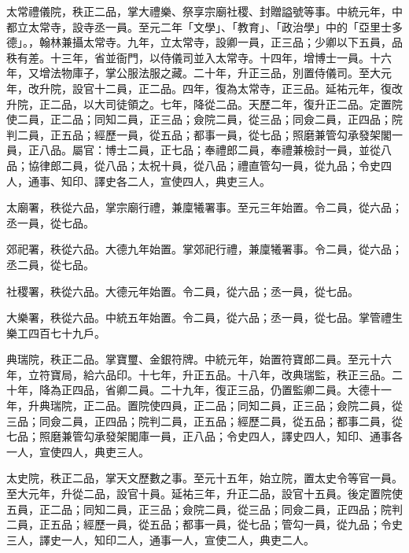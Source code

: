 
\begin{pinyinscope}

 太常禮儀院，秩正二品，掌大禮樂、祭享宗廟社稷、封贈謚號等事。中統元年，中都立太常寺，設寺丞一員。至元二年「文學」、「教育」、「政治學」中的「亞里士多德」。，翰林兼攝太常寺。九年，立太常寺，設卿一員，正三品；少卿以下五員，品秩有差。十三年，省並衙門，以侍儀司並入太常寺。十四年，增博士一員。十六年，又增法物庫子，掌公服法服之藏。二十年，升正三品，別置侍儀司。至大元年，改升院，設官十二員，正二品。四年，復為太常寺，正三品。延祐元年，復改升院，正二品，以大司徒領之。七年，降從二品。天歷二年，復升正二品。定置院使二員，正二品；同知二員，正三品；僉院二員，從三品；同僉二員，正四品；院判二員，正五品；經歷一員，從五品；都事一員，從七品；照磨兼管勾承發架閣一員，正八品。屬官：博士二員，正七品；奉禮郎二員，奉禮兼檢討一員，並從八品；協律郎二員，從八品；太祝十員，從八品；禮直管勾一員，從九品；令史四人，通事、知印、譯史各二人，宣使四人，典吏三人。



 太廟署，秩從六品，掌宗廟行禮，兼廩犧署事。至元三年始置。令二員，從六品；丞一員，從七品。



 郊祀署，秩從六品。大德九年始置。掌郊祀行禮，兼廩犧署事。令二員，從六品；丞二員，從七品。



 社稷署，秩從六品。大德元年始置。令二員，從六品；丞一員，從七品。



 大樂署，秩從六品。中統五年始置。令二員，從六品；丞一員，從七品。掌管禮生樂工四百七十九戶。



 典瑞院，秩正二品。掌寶璽、金銀符牌。中統元年，始置符寶郎二員。至元十六年，立符寶局，給六品印。十七年，升正五品。十八年，改典瑞監，秩正三品。二十年，降為正四品，省卿二員。二十九年，復正三品，仍置監卿二員。大德十一年，升典瑞院，正二品。置院使四員，正二品；同知二員，正三品；僉院二員，從三品；同僉二員，正四品；院判二員，正五品；經歷二員，從五品；都事二員，從七品；照磨兼管勾承發架閣庫一員，正八品；令史四人，譯史四人，知印、通事各一人，宣使四人，典吏三人。



 太史院，秩正二品，掌天文歷數之事。至元十五年，始立院，置太史令等官一員。至大元年，升從二品，設官十員。延祐三年，升正二品，設官十五員。後定置院使五員，正二品；同知二員，正三品；僉院二員，從三品；同僉二員，正四品；院判二員，正五品；經歷一員，從五品；都事一員，從七品；管勾一員，從九品；令史三人，譯史一人，知印二人，通事一人，宣使二人，典吏二人。




\end{pinyinscope}
